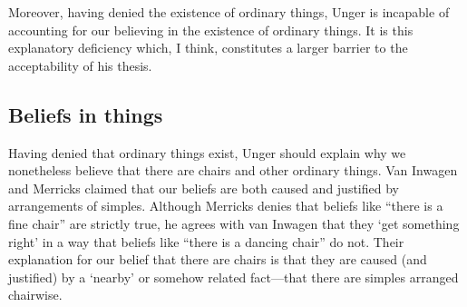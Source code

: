 \documentclass[11pt]{article}
\newenvironment{squote}{%
	\begin{quote}\begin{singlespace}%
	}{%
	\end{singlespace}\end{quote}}
\begin{document}
\begin{spacing}{1.5}
\begin{comment}
As we shall see,
color words are susceptible to the sorites paradox as well, but that
should not make us think that we cannot use `red' successfully:

\begin{squote}
It is\,\ldots\,unclear how far our use of e.g. the vocabulary of
colours \emph{is} consistent.  The descriptions given of awkward cases
may vary from occasion to occasion.  Besides that, the notion of using
a predicate consistently would appear to require some objective
criteria for variation in relevant respects among items to be
described in terms of it; but what is distinctive about observational
predicates is exactly the lack of such criteria.  So it would be
unwise to lean too heavily, as though it were a matter of hard fact,
upon the consistency of our employment of colour predicates.  What,
however, may be depended upon is that our use of these predicates is
largely \emph{successful}; the expectations which we form on the basis
of others' ascriptions of colour are not usually disappointed.
Agreement is generally possible about how colours are to be described;
and this, of course, is equivalent to saying that others \emph{seem}
to use colour predicates in a largely consistent way
\citep[361]{wright1975}.
\end{squote}

It is because we do seem to use color and other words in a consistent
way that the sorites paradoxes are troubling.  Unger's conclusion is
that there is no such consistency.  But where do we get this
impression of consistency in the first place?

I am not sure how Unger would reply (though I'll try to think of
something).  
\end{comment}

Moreover, having denied the existence of ordinary things, Unger is
incapable of accounting for our believing in the existence of ordinary
things.  It is this explanatory deficiency which, I think, constitutes
a larger barrier to the acceptability of his thesis.

\subsection{Beliefs in things}
\label{u-belief}
Having denied that ordinary things exist, Unger should explain why we
nonetheless believe that there are chairs and other ordinary things.
Van Inwagen and Merricks claimed that our beliefs are both caused and
justified by arrangements of simples.  Although Merricks denies that
beliefs like ``there is a fine chair'' are strictly true, he agrees with
van Inwagen that they `get something right' in a way that beliefs like
``there is a dancing chair'' do not.  Their explanation for our
belief that there are chairs is that they are caused (and justified)
by a `nearby' or somehow related fact---that there are simples
arranged chairwise.  


\end{spacing}
\end{document}
